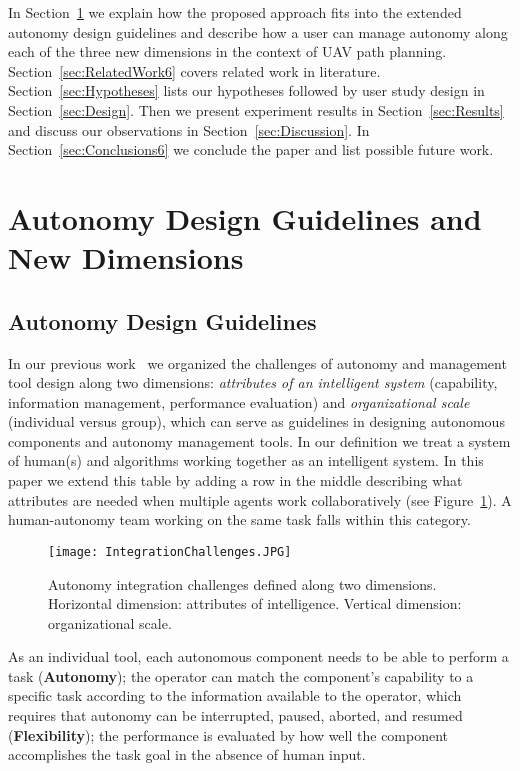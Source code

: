 In Section~\ref{sec:dimensions} we explain how the proposed approach fits into the extended autonomy design guidelines and describe how a user can manage autonomy along each of the three new dimensions in the context of UAV path planning. Section~\ref{sec:RelatedWork6} covers related work in literature. Section~\ref{sec:Hypotheses} lists our hypotheses followed by user study design in Section~\ref{sec:Design}. Then we present experiment results in Section~\ref{sec:Results} and discuss our observations in Section~\ref{sec:Discussion}. In Section~\ref{sec:Conclusions6} we conclude the paper and list possible future work.

\section{Autonomy Design Guidelines and New Dimensions}
\label{sec:dimensions}

\subsection{Autonomy Design Guidelines}

In our previous work~\cite{Lin2010Supporting} we organized the challenges of autonomy and management tool design along two dimensions: \textit{attributes of an intelligent system} (capability, information management, performance evaluation) and \textit{organizational scale} (individual versus group), which can serve as guidelines in designing autonomous components and autonomy management tools. In our definition we treat a system of human(s) and algorithms working together as an intelligent system. In this paper we extend this table by adding a row in the middle describing what attributes are needed when multiple agents work collaboratively (see Figure~\ref{IChallenges}). A human-autonomy team working on the same task falls within this category. 

\begin{figure}
\centering
\texttt{[image: IntegrationChallenges.JPG]}
\caption{Autonomy integration challenges defined along two dimensions. Horizontal dimension: attributes of intelligence. Vertical dimension: organizational scale.}
\label{IChallenges}
\end{figure}

As an individual tool, each autonomous component needs to be able to perform a task (\textbf{Autonomy}); the operator can match the component's capability to a specific task according to the information available to the operator, which requires that autonomy can be interrupted, paused, aborted, and resumed (\textbf{Flexibility}); the performance is evaluated by how well the component accomplishes the task goal in the absence of human input. 

